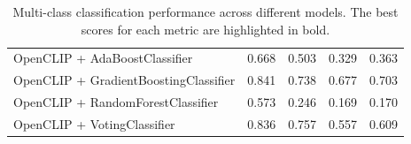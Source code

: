 \begin{table}[ht]
{\begin{tabular}{lcccc}
OpenCLIP + AdaBoostClassifier         & 0.668                     & 0.503                      & 0.329                   & 0.363                     \\
OpenCLIP + GradientBoostingClassifier & 0.841                     & 0.738                      & 0.677                   & 0.703                     \\
OpenCLIP + RandomForestClassifier     & 0.573                     & 0.246                      & 0.169                   & 0.170                     \\
OpenCLIP + VotingClassifier           & 0.836                     & 0.757                      & 0.557                   & 0.609                     \\
\bottomrule
\end{tabular}
}
  \caption{Multi-class classification performance across different models. The best scores for each metric are highlighted in bold.}
\label{tab:multi-class-results}
\end{table}